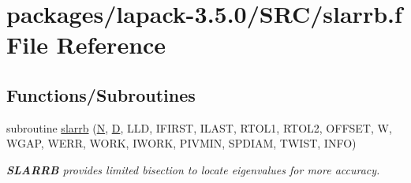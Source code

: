 \hypertarget{slarrb_8f}{}\section{packages/lapack-\/3.5.0/\+S\+R\+C/slarrb.f File Reference}
\label{slarrb_8f}
\subsection*{Functions/\+Subroutines}
\begin{DoxyCompactItemize}
\item 
subroutine \hyperlink{group__auxOTHERauxiliary_gad29562cff63b75a1f3f40e7f83aea2b7}{slarrb} (\hyperlink{polmisc_8c_a0240ac851181b84ac374872dc5434ee4}{N}, \hyperlink{odrpack_8h_a7dae6ea403d00f3687f24a874e67d139}{D}, L\+L\+D, I\+F\+I\+R\+S\+T, I\+L\+A\+S\+T, R\+T\+O\+L1, R\+T\+O\+L2, O\+F\+F\+S\+E\+T, W, W\+G\+A\+P, W\+E\+R\+R, W\+O\+R\+K, I\+W\+O\+R\+K, P\+I\+V\+M\+I\+N, S\+P\+D\+I\+A\+M, T\+W\+I\+S\+T, I\+N\+F\+O)
\begin{DoxyCompactList}\small\item\em {\bfseries S\+L\+A\+R\+R\+B} provides limited bisection to locate eigenvalues for more accuracy. \end{DoxyCompactList}\end{DoxyCompactItemize}

